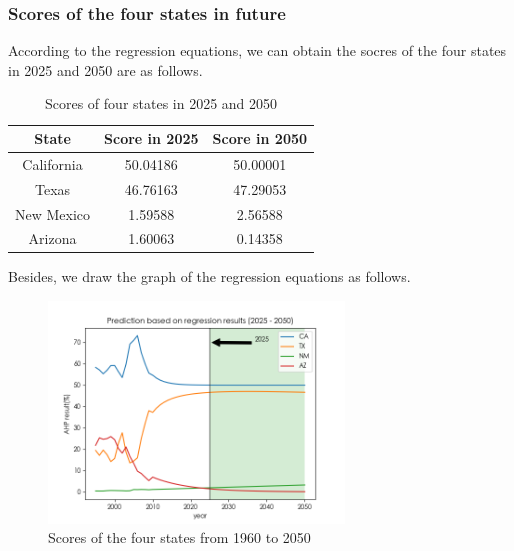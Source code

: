 \documentclass[a4paper,11pt]{article}
\begin{document}
\subsubsection{Scores of the four states in future}
\par According to the regression equations, we can obtain the socres of the four states in 2025 and 2050 are as follows.
\begin{table}[!hbp]
    \centering 
    \begin{tabular}{|c|c|c|}
\hline
State & Score in 2025 & Score in 2050 \\
\hline
California & 50.04186 & 50.00001 \\
\hline
Texas & 46.76163 & 47.29053 \\
\hline
New Mexico & 1.59588 & 2.56588 \\
\hline
Arizona & 1.60063 & 0.14358 \\
\hline
\end{tabular}
\caption{Scores of four states in 2025 and 2050}
\end{table}
\par Besides, we draw the graph of the regression equations as follows.
\begin{figure}[h]%
    \centering 
    \includegraphics[width=0.7\textwidth]{./Pic/D-scores.png}
    \caption{Scores of the four states from 1960 to 2050}
    \label{fig:D-scores}  
\end{figure}
\end{document}

